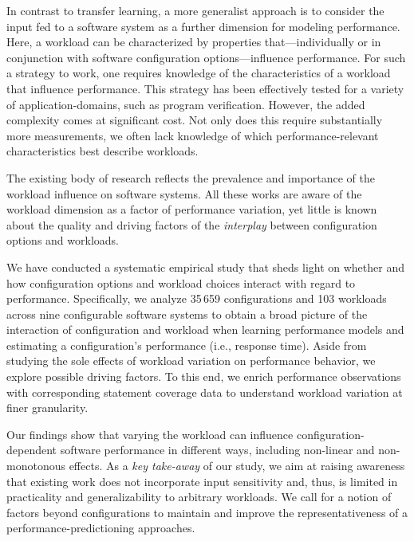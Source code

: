 In contrast to transfer learning, a more generalist approach is to consider the input fed to a software system as a further dimension for modeling performance. Here, a workload can be characterized by properties that---individually or in conjunction with software configuration options---influence performance. For such a strategy to work, one requires knowledge of the characteristics of a workload that influence performance. This strategy has been effectively tested for a  variety of application-domains, such as program verification. However, the added complexity comes at significant cost. 
Not only does this require substantially more measurements, we often lack knowledge of which performance-relevant characteristics best describe workloads.


The existing body of research reflects the prevalence and importance of the workload influence on software systems. All these works are aware of the workload dimension as a factor of performance variation, yet little is known about the quality and driving factors of the \emph{interplay} between configuration options and workloads. 

We have conducted a systematic empirical study that sheds light on whether and how configuration options and workload choices interact with regard to performance. 
Specifically, we analyze {\color{red}35\,659 configurations and 103 workloads across nine} configurable software systems to obtain a broad picture of the interaction of configuration and workload when learning performance models and estimating a configuration's performance (i.e., response time). Aside from studying the sole effects of workload variation on performance behavior, we explore possible driving factors. To this end, we enrich performance observations with corresponding statement coverage data to understand workload variation at finer granularity.

{\color{edited}Our findings show that varying the workload can influence con\-fi\-gu\-ra\-tion-de\-pen\-dent software performance in different ways, including non-linear and non-monotonous effects. 
As a \textit{key take-away} of our study, we aim at raising awareness that existing work does not incorporate input sensitivity and, thus, is limited in practicality and generalizability to arbitrary workloads. We call for a notion of factors beyond configurations to maintain and improve the representativeness of a performance-predictioning approaches.
}

